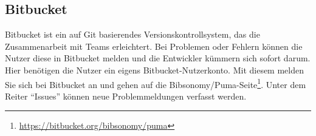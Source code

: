 \subsection{Bitbucket}
Bitbucket ist ein auf Git basierendes Versionskontrollsystem, das die Zusammenarbeit mit Teams erleichtert.  
\newline
Bei Problemen oder Fehlern können die Nutzer diese in Bitbucket melden und die Entwickler kümmern sich sofort darum. Hier benötigen die Nutzer ein eigens Bitbucket-Nutzerkonto. Mit diesem melden Sie sich bei Bitbucket an und gehen auf die Bibsonomy/Puma-Seite\footnote{\url{https://bitbucket.org/bibsonomy/puma}}. Unter dem Reiter \enquote{Issues} können neue Problemmeldungen verfasst werden.
